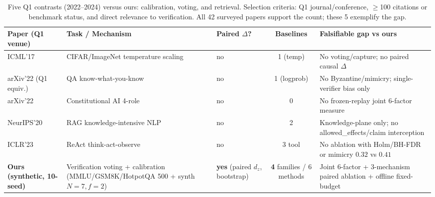 \documentclass[10pt]{article}
\begin{document}
\begin{table}[ht]
\centering
\caption{Five Q1 contrasts (2022--2024) versus ours: calibration, voting, and retrieval. Selection criteria: Q1 journal/conference, $\ge$100 citations or benchmark status, and direct relevance to verification. All 42 surveyed papers support the count; these 5 exemplify the gap.}
\label{tab:q1compare}
\footnotesize
\setlength{\tabcolsep}{3pt}
\begin{tabular}{p{2.6cm}p{2.4cm}p{2.6cm}cp{3.2cm}}
\toprule
Paper (Q1 venue) & Task / Mechanism & Paired $\Delta$? & Baselines & Falsifiable gap vs ours \\
\midrule
\citet{guo2017calibration} ICML'17 & CIFAR/ImageNet temperature scaling & no & 1 (temp) & No voting/capture; no paired causal $\Delta$ \\
\citet{kadavath2022language} arXiv'22 (Q1 equiv.) & QA know-what-you-know & no & 1 (logprob) & No Byzantine/mimicry; single-verifier bias only \\
\citet{bai2022constitutional} arXiv'22 & Constitutional AI 4-role & no & 0 & No frozen-replay joint 6-factor measure \\
\citet{lewis2020rag} NeurIPS'20 & RAG knowledge-intensive NLP & no & 2 & Knowledge-plane only; no allowed\_effects/claim interception \\
\citet{yao2023react} ICLR'23 & ReAct think-act-observe & no & 3 tool & No ablation with Holm/BH-FDR or mimicry $0.32$ vs $0.41$ \\
\textbf{Ours (synthetic, 10-seed)} & Verification voting + calibration (MMLU/\allowbreak GSM8K/\allowbreak HotpotQA 500 + synth $N{=}7,f{=}2$) & \textbf{yes} (paired $d_z$, bootstrap) & \textbf{4} families / 6 methods & Joint 6-factor + 3-mechanism paired ablation + offline fixed-budget \\
\bottomrule
\end{tabular}
\end{table}
\end{document}
